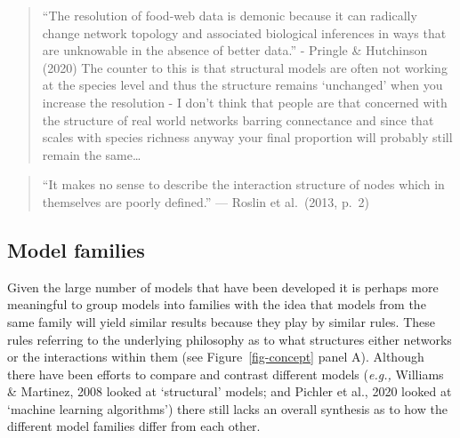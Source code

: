 \documentclass[
]{agujournal2019}
\begin{document}
\begin{quote}
``The resolution of food-web data is demonic because it can radically
change network topology and associated biological inferences in ways
that are unknowable in the absence of better data.'' - Pringle \&
Hutchinson (2020) The counter to this is that structural models are
often not working at the species level and thus the structure remains
`unchanged' when you increase the resolution - I don't think that people
are that concerned with the structure of real world networks barring
connectance and since that scales with species richness anyway your
final proportion will probably still remain the same\ldots{}
\end{quote}

\begin{quote}
``It makes no sense to describe the interaction structure of nodes which
in themselves are poorly defined.'' --- Roslin et al.~(2013, p.~2)
\end{quote}

\subsection{Model families}\label{model-families}

Given the large number of models that have been developed it is perhaps
more meaningful to group models into families with the idea that models
from the same family will yield similar results because they play by
similar rules. These rules referring to the underlying philosophy as to
what structures either networks or the interactions within them (see
Figure~\ref{fig-concept} panel A). Although there have been efforts to
compare and contrast different models (\emph{e.g.,} Williams \&
Martinez, 2008 looked at `structural' models; and Pichler et al., 2020
looked at `machine learning algorithms') there still lacks an overall
synthesis as to how the different model families differ from each other.
\end{document}
